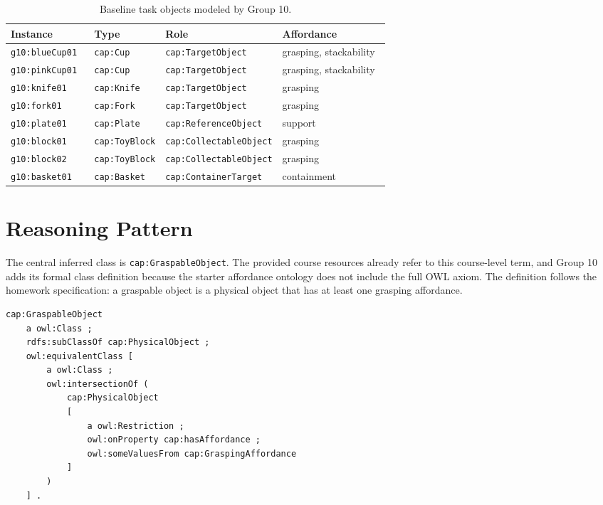 \documentclass[a4paper, 11pt]{article}
\begin{document}
\begin{table}[h]
\centering
\footnotesize
\setlength{\tabcolsep}{3pt}
\begin{tabularx}{\linewidth}{>{\raggedright\arraybackslash}p{0.22\linewidth} >{\raggedright\arraybackslash}p{0.15\linewidth} >{\raggedright\arraybackslash}p{0.25\linewidth} Y}
\toprule
\textbf{Instance} & \textbf{Type} & \textbf{Role} & \textbf{Affordance} \\
\midrule
\texttt{g10:blueCup01} & \texttt{cap:Cup} & \texttt{cap:TargetObject} & grasping, stackability \\
\texttt{g10:pinkCup01} & \texttt{cap:Cup} & \texttt{cap:TargetObject} & grasping, stackability \\
\texttt{g10:knife01} & \texttt{cap:Knife} & \texttt{cap:TargetObject} & grasping \\
\texttt{g10:fork01} & \texttt{cap:Fork} & \texttt{cap:TargetObject} & grasping \\
\texttt{g10:plate01} & \texttt{cap:Plate} & \texttt{cap:ReferenceObject} & support \\
\texttt{g10:block01} & \texttt{cap:ToyBlock} & \texttt{cap:CollectableObject} & grasping \\
\texttt{g10:block02} & \texttt{cap:ToyBlock} & \texttt{cap:CollectableObject} & grasping \\
\texttt{g10:basket01} & \texttt{cap:Basket} & \texttt{cap:ContainerTarget} & containment \\
\bottomrule
\end{tabularx}
\caption{Baseline task objects modeled by Group 10.}
\end{table}

\section{Reasoning Pattern}

The central inferred class is \texttt{cap:GraspableObject}. The provided course resources already refer to this course-level term, and Group 10 adds its formal class definition because the starter affordance ontology does not include the full OWL axiom. The definition follows the homework specification: a graspable object is a physical object that has at least one grasping affordance.

\begin{lstlisting}[language=Turtle]
cap:GraspableObject
    a owl:Class ;
    rdfs:subClassOf cap:PhysicalObject ;
    owl:equivalentClass [
        a owl:Class ;
        owl:intersectionOf (
            cap:PhysicalObject
            [
                a owl:Restriction ;
                owl:onProperty cap:hasAffordance ;
                owl:someValuesFrom cap:GraspingAffordance
            ]
        )
    ] .
\end{lstlisting}
\end{document}
